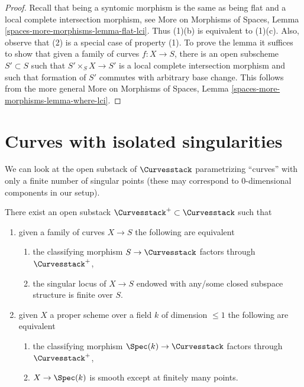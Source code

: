 \begin{proof}
Recall that being a syntomic morphism is the same as being flat and
a local complete intersection morphism, see
More on Morphisms of Spaces, Lemma \ref{spaces-more-morphisms-lemma-flat-lci}.
Thus (1)(b) is equivalent to (1)(c).
Also, observe that (2) is a special case of property (1).
To prove the lemma it suffices to show that given a family of curves
$f : X \to S$, there is an open subscheme $S' \subset S$
such that $S' \times_S X \to S'$ is a local complete intersection
morphism and such that formation of $S'$ commutes with arbitrary base change.
This follows from the more general
More on Morphisms of Spaces, Lemma \ref{spaces-more-morphisms-lemma-where-lci}.
\end{proof}




\section{Curves with isolated singularities}
\label{section-curves-isolated}

\noindent
We can look at the open substack of $\Curvesstack$
parametrizing ``curves'' with only a finite number of singular
points (these may correspond to $0$-dimensional components
in our setup).

\begin{lemma}
\label{lemma-isolated-sings-curves}
There exist an open substack
$\Curvesstack^{+} \subset \Curvesstack$
such that
\begin{enumerate}
\item given a family of curves $X \to S$ the following are equivalent
\begin{enumerate}
\item the classifying morphism $S \to \Curvesstack$ factors through
$\Curvesstack^{+}$,
\item the singular locus of $X \to S$ endowed
with any/some closed subspace structure is finite over $S$.
\end{enumerate}
\item given $X$ a proper scheme over a field $k$ of dimension $\leq 1$
the following are equivalent
\begin{enumerate}
\item the classifying morphism $\Spec(k) \to \Curvesstack$ factors
through $\Curvesstack^{+}$,
\item $X \to \Spec(k)$ is smooth except at finitely many points.
\end{enumerate}
\end{enumerate}
\end{lemma}

